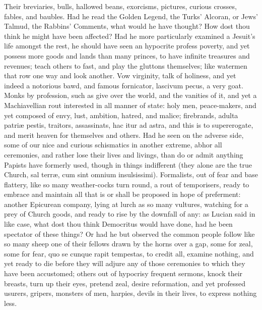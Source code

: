 {Their breviaries, bulls, hallowed beans, exorcisms, pictures, curious
crosses, fables, and baubles. Had he read the Golden Legend, the Turks'
Alcoran, or Jews' Talmud, the Rabbins' Comments, what would he have
thought? How dost thou think he might have been affected? Had he more
particularly examined a Jesuit's life amongst the rest, he should have
seen an hypocrite profess poverty, and yet possess more goods and
lands than many princes, to have infinite treasures and revenues; teach
others to fast, and play the gluttons themselves; like watermen that
row one way and look another. Vow virginity, talk of holiness, and
yet indeed a notorious bawd, and famous fornicator, lascivum pecus, a
very goat. Monks by profession, such as give over the world, and
the vanities of it, and yet a Machiavellian rout interested in all
manner of state: holy men, peace-makers, and yet composed of envy,
lust, ambition, hatred, and malice; firebrands, adulta patri\ae{} pestis,
traitors, assassinats, hac itur ad astra, and this is to supererogate,
and merit heaven for themselves and others. Had he seen on the adverse
side, some of our nice and curious schismatics in another extreme,
abhor all ceremonies, and rather lose their lives and livings, than do
or admit anything Papists have formerly used, though in things
indifferent (they alone are the true Church, sal terr\ae{}, cum sint
omnium insulsissimi). Formalists, out of fear and base flattery, like
so many weather-cocks turn round, a rout of temporisers, ready to
embrace and maintain all that is or shall be proposed in hope of
preferment: another Epicurean company, lying at lurch as so many
vultures, watching for a prey of Church goods, and ready to rise by the
downfall of any: as Lucian said in like case, what dost thou think
Democritus would have done, had he been spectator of these things?
Or had he but observed the common people follow like so many sheep one
of their fellows drawn by the horns over a gap, some for zeal, some for
fear, quo se cunque rapit tempestas, to credit all, examine nothing,
and yet ready to die before they will adjure any of those ceremonies to
which they have been accustomed; others out of hypocrisy frequent
sermons, knock their breasts, turn up their eyes, pretend zeal, desire
reformation, and yet professed usurers, gripers, monsters of men,
harpies, devils in their lives, to express nothing less.

}
